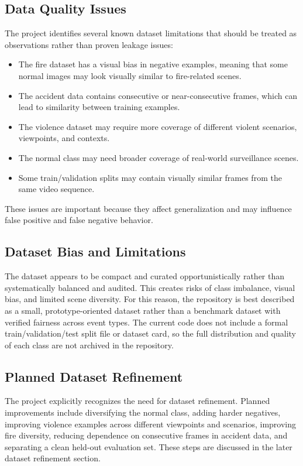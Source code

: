 \documentclass[11pt,a4paper]{article}
\begin{document}
\subsection{Data Quality Issues}
The project identifies several known dataset limitations that should be treated as observations rather than proven leakage issues:
\begin{itemize}[leftmargin=1.5em]
    \item The fire dataset has a visual bias in negative examples, meaning that some normal images may look visually similar to fire-related scenes.
    \item The accident data contains consecutive or near-consecutive frames, which can lead to similarity between training examples.
    \item The violence dataset may require more coverage of different violent scenarios, viewpoints, and contexts.
    \item The normal class may need broader coverage of real-world surveillance scenes.
    \item Some train/validation splits may contain visually similar frames from the same video sequence.
\end{itemize}
These issues are important because they affect generalization and may influence false positive and false negative behavior.

\subsection{Dataset Bias and Limitations}
The dataset appears to be compact and curated opportunistically rather than systematically balanced and audited. This creates risks of class imbalance, visual bias, and limited scene diversity. For this reason, the repository is best described as a small, prototype-oriented dataset rather than a benchmark dataset with verified fairness across event types. The current code does not include a formal train/validation/test split file or dataset card, so the full distribution and quality of each class are not archived in the repository.

\subsection{Planned Dataset Refinement}
The project explicitly recognizes the need for dataset refinement. Planned improvements include diversifying the normal class, adding harder negatives, improving violence examples across different viewpoints and scenarios, improving fire diversity, reducing dependence on consecutive frames in accident data, and separating a clean held-out evaluation set. These steps are discussed in the later dataset refinement section.
\end{document}
